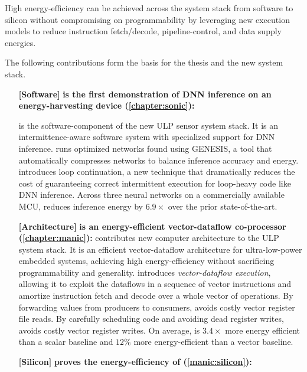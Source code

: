 \begin{adjustwidth}{1cm}{1cm}
High energy-efficiency can be achieved 
across the system stack from software to silicon without compromising on programmability by leveraging new execution models to reduce instruction fetch/decode, pipeline-control, and data supply energies.
% 

\end{adjustwidth}
% 
The following contributions form the basis for the thesis and the new system stack.

\begin{itemize}

\item[\textbf{[Software]}]
\textbf{\sonic is the first demonstration of DNN inference on an energy-harvesting device (\autoref{chapter:sonic}): }

\sonic is the software-component of the new ULP sensor system stack.
% 
It is an intermittence-aware software system with specialized support for DNN inference. 
% 
\sonic runs optimized networks found using GENESIS, a tool that automatically compresses networks to balance inference accuracy and energy.
% 
\sonic introduces loop continuation, a new technique that dramatically reduces the cost of guaranteeing correct intermittent execution for loop-heavy code like DNN inference. 
% 
Across three neural networks on a commercially available MCU, \sonic reduces inference energy by $6.9\times$ over the prior state-of-the-art.

\item[\textbf{[Architecture]}]
\textbf{\manic is an energy-efficient vector-dataflow co-processor (\autoref{chapter:manic}): }
\manic contributes new computer architecture to the ULP system stack.
% 
It is an efficient vector-dataflow architecture for ultra-low-power embedded systems, achieving high energy-efficiency without sacrificing programmability and generality.
% 
\manic introduces \emph{vector-dataflow execution}, allowing it to exploit the
dataflows in a sequence of vector instructions and amortize instruction
fetch and decode over a whole vector of operations.
%
By forwarding values from producers to consumers, \manic avoids costly vector register file reads.
% 
By carefully scheduling code and avoiding dead register writes, \manic avoids costly vector register writes.
% 
On average, \manic is $3.4\times$ more energy efficient than a scalar baseline and $12\%$ more energy-efficient than a vector baseline.

\item[\textbf{[Silicon]}]
\textbf{\msilicon proves the energy-efficiency of \manic (\autoref{manic:silicon}): }


\end{itemize}
